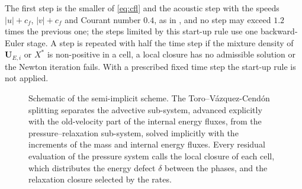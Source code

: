 \documentclass[a4paper,fleqn]{cas-sc}
\begin{document}
The first step is the smaller of \eqref{eq:cfl} and the acoustic step with the speeds $|u|+c_f$, $|v|+c_f$ and Courant number
$0.4$, as in \cite{BattistiBoscheri2025}, and no step may exceed $1.2$ times the previous one; the steps limited by this start-up
rule use one backward-Euler stage. A step is repeated with half the time step if the mixture density of $\mathbf U_{E,i}$ or $X^*$
is non-positive in a cell, a local closure has no admissible solution or the Newton iteration fails. With a prescribed fixed
time step the start-up rule is not applied.


\clearpage
\begin{figure}[p]
\centering
\resizebox*{!}{0.88\textheight}{}
\caption{Schematic of the semi-implicit scheme. The Toro--V\'azquez-Cend\'on splitting separates the advective
sub-system, advanced explicitly with the old-velocity part of the internal energy fluxes, from the pressure--relaxation
sub-system, solved implicitly with the increments of the mass and internal energy fluxes. Every residual evaluation of the pressure system calls the local closure of each cell, which
distributes the energy defect $\delta$ between the phases, and the relaxation closure selected by the rates.}
\label{fig:scheme}
\end{figure}
\clearpage
\end{document}
